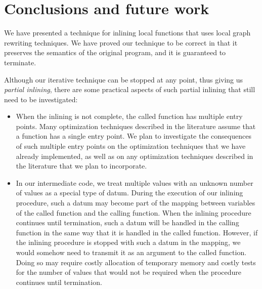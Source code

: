 \section{Conclusions and future work}
\label{sec-conclusions}

We have presented a technique for inlining local functions that uses
local graph rewriting techniques.  We have proved our technique to be
correct in that it preserves the semantics of the original program,
and it is guaranteed to terminate.

Although our iterative technique can be stopped at any point, thus
giving us \emph{partial inlining}, there are some practical aspects of
such partial inlining that still need to be investigated:

\begin{itemize}
\item When the inlining is not complete, the called function has
  multiple entry points.  Many optimization techniques described in
  the literature assume that a function has a single entry point.  We
  plan to investigate the consequences of such multiple entry points
  on the optimization techniques that we have already implemented, as
  well as on any optimization techniques described in the literature
  that we plan to incorporate.
\item In our intermediate code, we treat multiple values with an
  unknown number of values as a special type of datum.  During the
  execution of our inlining procedure, such a datum may become part of
  the mapping between variables of the called function and the calling
  function.  When the inlining procedure continues until termination,
  such a datum will be handled in the calling function in the same way
  that it is handled in the called function.  However, if the inlining
  procedure is stopped with such a datum in the mapping, we would
  somehow need to transmit it as an argument to the called function.
  Doing so may require costly allocation of temporary memory and
  costly tests for the number of values that would not be required
  when the procedure continues until termination.
\end{itemize}
